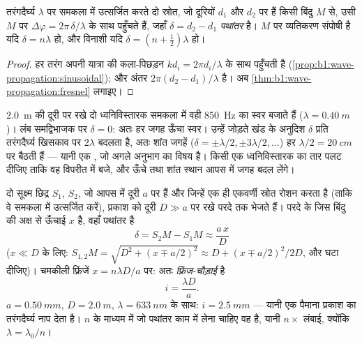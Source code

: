 \begin{proposition}[समकला में दो स्रोत; पथांतर]\label{prop:b1:wave-propagation:pathdiff}
तरंगदैर्घ्य $\lambda$ पर समकला में उत्सर्जित करते दो स्रोत, जो दूरियों $d_1$
और $d_2$ पर हैं किसी बिंदु $M$ से, उसी $M$ पर
$\Delta\varphi = 2\pi\,\delta/\lambda$ के साथ पहुँचते हैं, जहाँ $\delta = d_2 - d_1$
\emph{पथांतर} है। $M$ पर व्यतिकरण संपोषी है यदि
$\delta = n\lambda$ हो, और विनाशी यदि $\delta = (n + \tfrac12)\lambda$ हो।
\end{proposition}

\begin{proof}
हर तरंग अपनी यात्रा की कला-पिछड़न $kd_i = 2\pi d_i/\lambda$ के साथ पहुँचती है
(\cref{prop:b1:wave-propagation:sinusoidal}); और अंतर
$2\pi(d_2 - d_1)/\lambda$ है। अब \cref{thm:b1:wave-propagation:fresnel} लगाइए।
\end{proof}

\begin{example}[दो ध्वनिविस्तारक]\label{ex:b1:wave-propagation:speakers}
\qty{2.0}{m} की दूरी पर रखे दो ध्वनिविस्तारक समकला में वही \qty{850}{Hz}
का स्वर बजाते हैं ($\lambda = \qty{0.40}{m}$)। लंब समद्विभाजक पर
$\delta = 0$: अतः हर जगह ऊँचा स्वर। उन्हें जोड़ते खंड के अनुदिश $\delta$
प्रति तरंगदैर्घ्य खिसकाव पर $2\lambda$ बदलता है, अतः शांत जगहें
($\delta = \pm\lambda/2, \pm 3\lambda/2, \dots$) हर
$\lambda/2 = \qty{20}{cm}$ पर बैठती हैं --- यानी एक , जो अगले
अनुभाग का विषय है। किसी एक ध्वनिविस्तारक का तार पलट दीजिए ताकि वह विपरीत 
में बजे, और ऊँचे तथा शांत स्थान आपस में जगह बदल लेंगे।
\end{example}

\begin{example}[यंग के छिद्र]\label{ex:b1:wave-propagation:young}
दो सूक्ष्म छिद्र $S_1$, $S_2$, जो आपस में दूरी $a$ पर हैं और जिन्हें एक ही
एकवर्णी स्रोत रोशन करता है (ताकि वे समकला में उत्सर्जित करें), प्रकाश को
दूरी $D \gg a$ पर रखे परदे तक भेजते हैं। परदे के जिस बिंदु की अक्ष से ऊँचाई
$x$ है, वहाँ पथांतर है
\[
\delta = S_2M - S_1M \approx \frac{a\,x}{D}
\]
($x \ll D$ के लिए: $S_{1,2}M = \sqrt{D^2 + (x \mp a/2)^2} \approx D +
(x \mp a/2)^2/2D$, और घटा दीजिए)। चमकीली फ़्रिंजें $x = n\lambda D/a$ पर:
अतः \emph{फ़्रिंज-चौड़ाई} है
\[
i = \frac{\lambda D}{a} .
\]
$a = \qty{0.50}{mm}$, $D = \qty{2.0}{m}$, $\lambda = \qty{633}{nm}$ के साथ:
$i = \qty{2.5}{mm}$ --- यानी एक पैमाना प्रकाश का तरंगदैर्घ्य नाप देता है।
 $n$ के माध्यम में जो पथांतर काम में लेना चाहिए वह
\emph{} है, यानी $n \times$ लंबाई, क्योंकि $\lambda = \lambda_0/n$।
\end{example}

